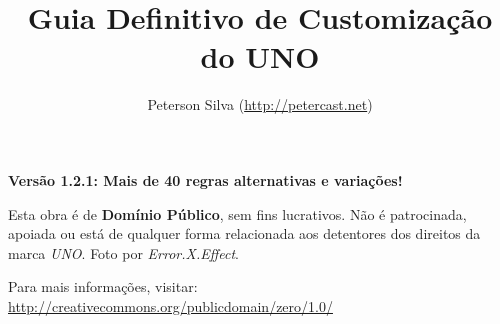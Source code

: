 \documentclass[a5paper,10pt,final,openright]{memoir}
\title{Guia Definitivo de Customização do UNO}
\author{Peterson Silva (\url{http://petercast.net})}
\date{}
\begin{document}

\maketitle

\begin{center}
\textbf{Versão 1.2.1: Mais de 40 regras alternativas e variações!}
\end{center}

\begin{figure}[!h]
\centering
{}
\end{figure}

\thispagestyle{empty}

\begin{center}
Esta obra é de \textbf{Domínio Público}, sem fins lucrativos. Não é patrocinada, apoiada ou está de qualquer forma relacionada aos detentores dos direitos da marca \textit{UNO}. Foto por \textit{Error.X.Effect}.
\end{center}

\begin{center}
Para mais informações, visitar: \\

\url{http://creativecommons.org/publicdomain/zero/1.0/}
\end{center}


\end{document}
